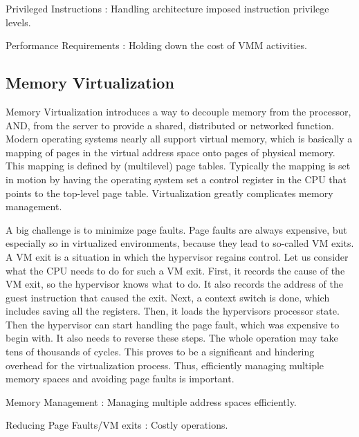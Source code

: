 \begin{description}
\item[Main challenges for CPU virtualization]
\item Privileged Instructions : Handling architecture imposed instruction privilege levels.

 Performance Requirements : Holding down the cost of VMM activities.
\end{description} 

\subsection{Memory Virtualization}
\label{sec:vir}
Memory Virtualization introduces a way to decouple memory from the processor, AND, from the server to provide a shared, distributed or networked function. Modern operating systems nearly all support virtual memory, which is basically a mapping of pages in the virtual address space onto pages of physical memory. This mapping is defined by (multilevel) page tables. Typically the mapping is set in motion by having the operating system set a control register in the CPU that points to the top-level page table. Virtualization greatly complicates memory management.

A big challenge is to minimize page faults. Page faults are always expensive, but especially so in virtualized environments, because they lead to so-called VM exits. A VM exit is a situation in which the
hypervisor regains control. Let us consider what the CPU needs to do for such a VM exit. First, it records the cause of the VM exit, so the hypervisor knows what to do. It also records the address of the guest instruction that caused the exit. Next, a context switch is done, which includes saving all the registers. Then, it loads the
hypervisors processor state. Then the hypervisor can start handling the page fault, which was expensive to begin with. It also needs to reverse these steps. The whole operation may take tens of thousands of cycles. This proves to be a significant and hindering overhead for the virtualization process. Thus, efficiently managing multiple memory spaces and avoiding page faults is important.

\begin{description}
\item[Main challenges for Memory virtualization]
\item Memory Management : Managing multiple address spaces efficiently.

 Reducing Page Faults/VM exits : Costly operations.
\end{description} 
 
